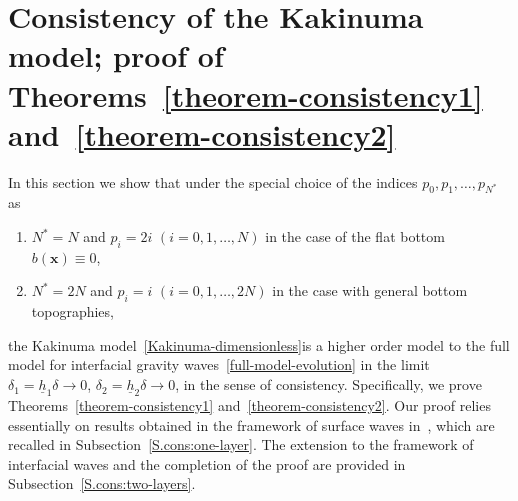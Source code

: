 \documentclass[11pt,leqno]{article}
\numberwithin{equation}{section}
\numberwithin{figure}{section}
\begin{document}
\section{Consistency of the Kakinuma model; 
 proof of Theorems~\ref{theorem-consistency1} and~\ref{theorem-consistency2}}\label{S.consistency}
%
In this section we show that under the special choice of the indices $p_0,p_1,\ldots,p_{N^*}$ as 
%
\begin{enumerate}
\item[(H1)]
$N^*=N$ and $p_i=2i$ $(i=0,1,\ldots,N)$ in the case of the flat bottom $b(\bm{x})\equiv0$, 
%
\item[(H2)]
$N^*=2N$ and $p_i=i$ $(i=0,1,\ldots,2N)$ in the case with general bottom topographies,
\end{enumerate}
%
the Kakinuma model~\eqref{Kakinuma-dimensionless}is a higher order model to the full model for interfacial gravity waves~\eqref{full-model-evolution} 
in the limit ${\delta_1=\underline{h}_1\delta\to0}$, ${\delta_2=\underline{h}_2\delta\to 0}$, in the sense of consistency. 
Specifically, we prove Theorems~\ref{theorem-consistency1} and~\ref{theorem-consistency2}. 
Our proof relies essentially on results obtained in the framework of surface waves in~\cite{Iguchi2018-2}, which are recalled in Subsection~\ref{S.cons:one-layer}. 
The extension to the framework of interfacial waves and the completion of the proof are provided in Subsection~\ref{S.cons:two-layers}. 


\end{document}
